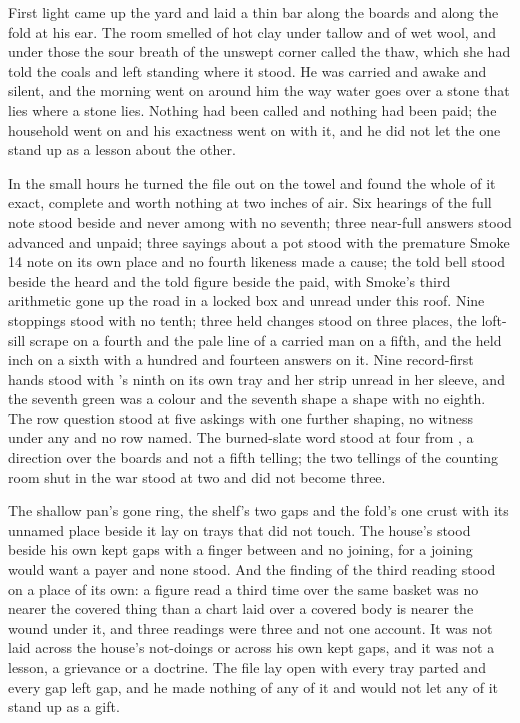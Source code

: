 First light came up the yard and laid a thin bar along the boards and along the fold at his ear. The room smelled of hot clay under tallow and of wet wool, and under those the sour breath of the unswept corner called the thaw, which she had told the coals and left standing where it stood. He was carried and awake and silent, and the morning went on around him the way water goes over a stone that lies where a stone lies. Nothing had been called and nothing had been paid; the household went on and his exactness went on with it, and he did not let the one stand up as a lesson about the other.

\scenebreak

In the small hours he turned the file out on the towel and found the whole of it exact, complete and worth nothing at two inches of air. Six hearings of the full note stood beside and never among with no seventh; three near-full answers stood advanced and unpaid; three sayings about a pot stood with the premature Smoke 14 note on its own place and no fourth likeness made a cause; the told bell stood beside the heard and the told figure beside the paid, with Smoke's third arithmetic gone up the road in a locked box and unread under this roof. Nine stoppings stood with no tenth; three held changes stood on three places, the loft-sill scrape on a fourth and the pale line of a carried man on a fifth, and the held inch on a sixth with a hundred and fourteen answers on it. Nine record-first hands stood with 's ninth on its own tray and her strip unread in her sleeve, and the seventh green was a colour and the seventh shape a shape with no eighth. The row question stood at five askings with one further shaping, no witness under any and no row named. The burned-slate word stood at four from , a direction over the boards and not a fifth telling; the two tellings of the counting room shut in the war stood at two and did not become three.

The shallow pan's gone ring, the shelf's two gaps and the fold's one crust with its unnamed place beside it lay on trays that did not touch. The house's  stood beside his own kept gaps with a finger between and no joining, for a joining would want a payer and none stood. And the finding of the third reading stood on a place of its own: a figure read a third time over the same basket was no nearer the covered thing than a chart laid over a covered body is nearer the wound under it, and three readings were three and not one account. It was not laid across the house's not-doings or across his own kept gaps, and it was not a lesson, a grievance or a doctrine. The file lay open with every tray parted and every gap left gap, and he made nothing of any of it and would not let any of it stand up as a gift.

